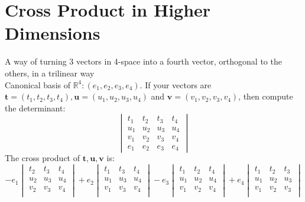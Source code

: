\documentclass[11pt]{article}
\newcommand{\tb}[1]{\textbf{#1}}
\newcommand{\real}[0]{\mathbb{R}}
\begin{document}
	\section{Cross Product in Higher Dimensions}
	A way of turning 3 vectors in 4-space into a fourth vector, orthogonal to the others, in a trilinear way \\
	Canonical basis of $\real^4: (e_1, e_2, e_3, e_4)$. If your vectors are $\tb{t} = (t_1, t_2, t_3, t_4), \tb{u} = (u_1, u_2, u_3, u_4)$ and $\tb{v} = (v_1, v_2, v_3, v_4)$, then compute the determinant:
	$$\begin{vmatrix}
	t_1 & t_2 & t_3 & t_4 \\
	u_1 & u_2 & u_3 & u_4 \\
	v_1 & v_2 & v_3 & v_4 \\
	e_1 & e_2 & e_3 & e_4
	\end{vmatrix}$$
	The cross product of $\tb{t}, \tb{u}, \tb{v}$ is:
		$$-e_1\begin{vmatrix}
	 t_2 & t_3 & t_4 \\
	 u_2 & u_3 & u_4 \\
	 v_2 & v_3 & v_4 \\
	\end{vmatrix}
	+e_2\begin{vmatrix}
	t_1 & t_3 & t_4 \\
	u_1 & u_3 & u_4 \\
	v_1 & v_3 & v_4 \\
	\end{vmatrix}
	- e_3\begin{vmatrix}
	t_1 & t_2 & t_4 \\
	u_1 & u_2 & u_4 \\
	v_1 & v_2 & v_4 \\
	\end{vmatrix}
	+ e_4\begin{vmatrix}
	t_1 & t_2 & t_3 \\
	u_1 & u_2 & u_3 \\
	v_1 & v_2 & v_3 \\
	\end{vmatrix}
	$$
\end{document}
